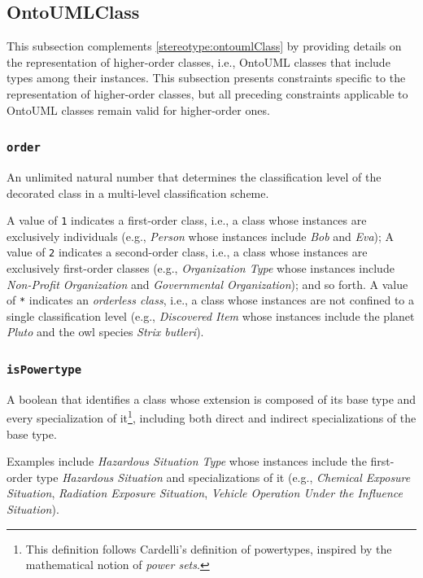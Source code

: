 \FloatBarrier
\subsection{OntoUMLClass}
\label{stereotype:ontoumlClass-mlt}

This subsection complements \autoref{stereotype:ontoumlClass} by providing details on the representation of higher-order classes, i.e., OntoUML classes that include types among their instances. This subsection presents constraints specific to the representation of higher-order classes, but all preceding constraints applicable to OntoUML classes remain valid for higher-order ones.

\subsubsection{\texttt{order}}

An unlimited natural number that determines the classification level of the decorated class in a multi-level classification scheme.

A value of \texttt{1} indicates a first-order class, i.e., a class whose instances are exclusively individuals (e.g., \textit{Person} whose instances include \textit{Bob} and \textit{Eva}); A value of \texttt{2} indicates a second-order class, i.e., a class whose instances are exclusively first-order classes (e.g., \textit{Organization Type} whose instances include \textit{Non-Profit Organization} and \textit{Governmental Organization}); and so forth. A value of \texttt{*} indicates an \textit{orderless class}, i.e., a class whose instances are not confined to a single classification level (e.g., \textit{Discovered Item} whose instances include the planet \textit{Pluto} and the owl species \textit{Strix butleri}).
    
\subsubsection{\texttt{isPowertype}}

A boolean that identifies a class whose extension is composed of its base type and every specialization of it\footnote{This definition follows Cardelli's definition of powertypes, inspired by the mathematical notion of \textit{power sets}.}, including both direct and indirect specializations of the base type.

Examples include \textit{Hazardous Situation Type} whose instances include the first-order type \textit{Hazardous Situation} and specializations of it (e.g., \textit{Chemical Exposure Situation}, \textit{Radiation Exposure Situation}, \textit{Vehicle Operation Under the Influence Situation}).

